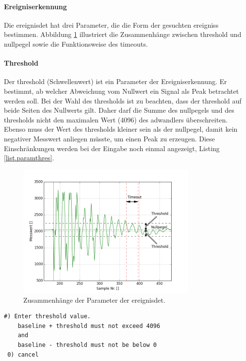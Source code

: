 \paragraph{Ereigniserkennung} Die \gls{ereignisdet} hat drei Parameter, die die Form der gesuchten \glspl{ereignis} bestimmen.  Abbildung \ref{fig.params} illustriert die Zusammenhänge zwischen \gls{threshold} und \gls{nullpegel} sowie die Funktionsweise des \gls{timeout}s.

\paragraph{Threshold} Der \gls{threshold} (Schwellenwert) ist ein Parameter der Ereigniserkennung. Er bestimmt, ab welcher Abweichung vom Nullwert ein Signal als Peak betrachtet werden soll. Bei der Wahl des \gls{threshold}s ist zu beachten, dass der \gls{threshold} auf beide Seiten des Nullwerts gilt. Daher darf die Summe des \gls{nullpegel}s und des \gls{threshold}s nicht den maximalen Wert (4096) des \gls{adwandler}s überschreiten. Ebenso muss der Wert des \gls{threshold}s kleiner sein als der \gls{nullpegel}, damit kein negativer Messwert anliegen müsste, um einen Peak zu erzeugen. Diese Einschränkungen werden bei der Eingabe noch einmal angezeigt, Listing \ref{list.paramthres}.

\begin{figure}
	\centering
		\includegraphics[width=0.8\textwidth]{images/impact_params.png}
	\caption{Zusammenhänge der Parameter der \gls{ereignisdet}.}
	\label{fig.params}
\end{figure}

\begin{lstlisting}[caption=Untermenü Threshold, label=list.paramthres]
 #) Enter threshold value.
    baseline + threshold must not exceed 4096
    and
    baseline - threshold must not be below 0
 0) cancel
\end{lstlisting}

